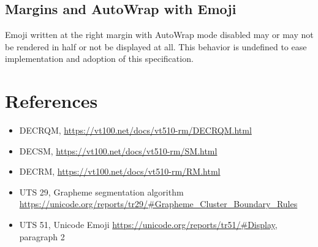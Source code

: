\documentclass{article}
\begin{document}
\subsection{Margins and AutoWrap with Emoji}

Emoji written at the right margin with AutoWrap mode disabled
may or may not be rendered in half or not be displayed at all.
This behavior is undefined to ease implementation and adoption 
of this specification.

\section{References}

\begin{itemize}
	\item \label{ref:DECRQM}DECRQM, \url{https://vt100.net/docs/vt510-rm/DECRQM.html}
	\item \label{ref:DECSM}DECSM, \url{https://vt100.net/docs/vt510-rm/SM.html}
	\item \label{ref:DECRM}DECRM, \url{https://vt100.net/docs/vt510-rm/RM.html}
    \item \label{ref:UTS-29}UTS 29, Grapheme segmentation algorithm
		\url{https://unicode.org/reports/tr29/\#Grapheme\_Cluster\_Boundary\_Rules}
    \item \label{ref:UTS-51}UTS 51, Unicode Emoji
		\url{https://unicode.org/reports/tr51/\#Display}, paragraph 2
\end{itemize}
\end{document}
